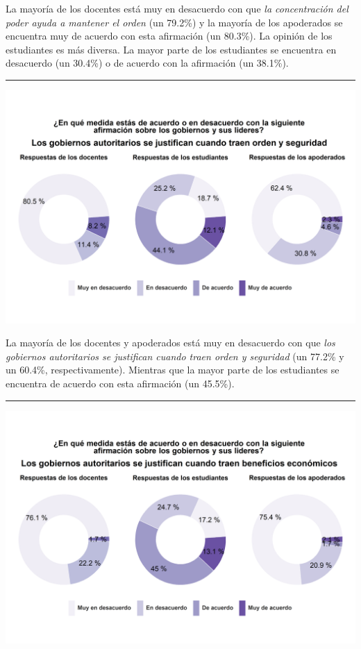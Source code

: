 \documentclass[
  14pt,
]{book}
\let\origfigure\figure
\let\endorigfigure\endfigure
\renewenvironment{figure}[1][2] {
  \expandafter\origfigure\expandafter[H]
} {
  \endorigfigure
}
\begin{document}
La mayoría de los docentes está muy en desacuerdo con que \emph{la concentración del poder ayuda a mantener el orden} (un 79.2\%) y la mayoría de los apoderados se encuentra muy de acuerdo con esta afirmación (un 80.3\%). La opinión de los estudiantes es más diversa. La mayor parte de los estudiantes se encuentra en desacuerdo (un 30.4\%) o de acuerdo con la afirmación (un 38.1\%).

\begin{center}\rule{0.5\linewidth}{0.5pt}\end{center}

\begin{figure}[!ht]

{\centering \includegraphics[width=0.8\linewidth,]{images/graph_aut8} 

}

\caption{El orden y la seguridad justifican los gobiernos autoritarios}\label{fig:unnamed-chunk-49}
\end{figure}

La mayoría de los docentes y apoderados está muy en desacuerdo con que \emph{los gobiernos autoritarios se justifican cuando traen orden y seguridad} (un 77.2\% y un 60.4\%, respectivamente). Mientras que la mayor parte de los estudiantes se encuentra de acuerdo con esta afirmación (un 45.5\%).

\begin{center}\rule{0.5\linewidth}{0.5pt}\end{center}

\begin{figure}[!ht]

{\centering \includegraphics[width=0.8\linewidth,]{images/graph_aut9} 

}

\caption{Los beneficios económicos justifican los gobiernos autoritarios}\label{fig:unnamed-chunk-50}
\end{figure}
\end{document}
